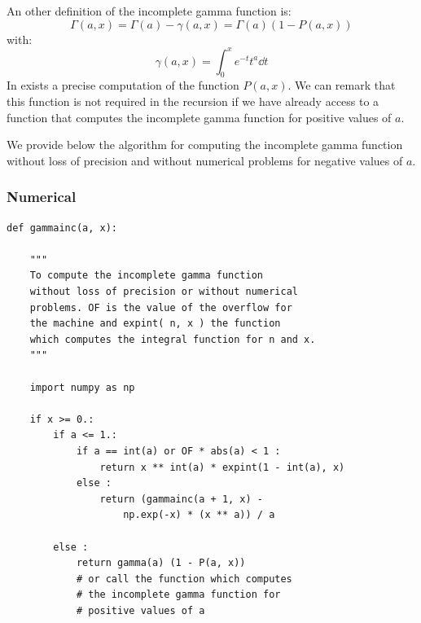 An other definition of the incomplete gamma function is:
%
\begin{equation}
    \Gamma\left({a,x}\right)=\Gamma\left({a}\right)-\gamma\left({a,x}\right)=\Gamma\left({a}\right)\left({1-P\left({a,x}\right)}\right)
\end{equation}
%
with:
%
\begin{equation}
    \gamma\left({a,x}\right)=\int_0^x{e^{-t}{t^{a}}\dd{t}}
\end{equation}
%
In \citet{NumericalRecipes} exists a precise computation of the function
$P\left({a,x}\right)$. We can remark that this function is not required in the
recursion if we have already access to a function that computes the incomplete
gamma function for positive values of $a$.

We provide below the algorithm for computing the incomplete gamma function
without loss of precision and without numerical problems for negative values of
$a$.
%
\subsubsection{Numerical}
%
\begin{verbatim}
def gammainc(a, x):

    """
    To compute the incomplete gamma function
    without loss of precision or without numerical
    problems. OF is the value of the overflow for
    the machine and expint( n, x ) the function
    which computes the integral function for n and x.
    """

    import numpy as np

    if x >= 0.:
        if a <= 1.:
            if a == int(a) or OF * abs(a) < 1 :
                return x ** int(a) * expint(1 - int(a), x)
            else :
                return (gammainc(a + 1, x) -
                    np.exp(-x) * (x ** a)) / a

        else :
            return gamma(a) (1 - P(a, x))
            # or call the function which computes
            # the incomplete gamma function for
            # positive values of a
\end{verbatim}

